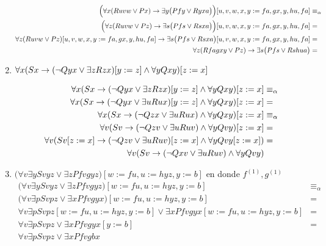 \documentclass[11pt,letterpaper]{article}
\begin{document}
\begin{enumerate}
  \begin{align*}
    \Big(\forall x (Ruvw \lor Px) \rightarrow \exists y \big(Pfy \lor 
    Ryxa\big)\Big) [u,v , w, x, y:=fa, gx, y, hu, fa] &\equiv_\alpha\\
    \Big(\forall z (Ruvw \lor Pz) \rightarrow \exists s \big(Pfs \lor 
    Rsxa\big)\Big) [u,v , w, x, y:=fa, gx, y, hu, fa] &= \\
    \forall z (Ruvw \lor Pz)[u,v , w, x, y:=fa, gx, y, hu, fa] \rightarrow
    \exists s \big(Pfs \lor 
    Rsxa\big) [u,v , w, x, y:=fa, gx, y, hu, fa] &= \\
    \forall z (Rfagxy \lor Pz)\rightarrow
    \exists s \big(Pfs \lor 
    Rshua\big) &= 
  \end{align*}
\item $\forall x (Sx \rightarrow (\neg Qyx \lor \exists z Rzx) [y:=z] \land \forall y Qxy) [z:=x]$

  \begin{align*}
    \forall x (Sx \rightarrow (\neg Qyx \lor \exists z Rzx) [y:=z]
    \land \forall y Qxy) [z:=x] &\equiv_\alpha \\
    \forall x (Sx \rightarrow (\neg Qyx \lor \exists u Rux) [y:=z]
    \land \forall y Qxy) [z:=x] &=\\
    \forall x (Sx \rightarrow (\neg Qzx \lor \exists u Rux)
    \land \forall y Qxy) [z:=x] &\equiv_\alpha\\
    \forall v (Sv \rightarrow (\neg Qzv \lor \exists u Ruv)
    \land \forall y Qvy) [z:=x] &=\\
    \forall v (Sv  [z:=x]\rightarrow (\neg Qzv \lor \exists u Ruv) [z:=x]
    \land \forall y Qvy  [z:=x]) &=\\
    \forall v (Sv \rightarrow (\neg Qxv \lor \exists u Ruv)
    \land \forall y Qvy)
  \end{align*}
  
\item $\big(\forall v\exists y Svyz\lor\exists z Pfvgyz\big)
  [w:=fu,u:=hyz, y:=b]$ en donde $f^{(1)},g^{(1)}$
  \begin{align*}
    \big(\forall v\exists y Svyz\lor\exists z Pfvgyz\big)
    [w:=fu,u:=hyz, y:=b]&\equiv_\alpha \\
    \big(\forall v\exists p Svpz\lor\exists x Pfvgyx\big)
    [w:=fu,u:=hyz, y:=b]&= \\
    \forall v\exists p Svpz[w:=fu,u:=hyz, y:=b]\lor\exists
    x Pfvgyx[w:=fu,u:=hyz, y:=b]&= \\
    \forall v\exists p Svpz\lor\exists
    x Pfvgyx[y:=b]&= \\
    \forall v\exists p Svpz\lor\exists
    x Pfvgbx\\
  \end{align*}
  \ei


\end{enumerate}
\end{document}
